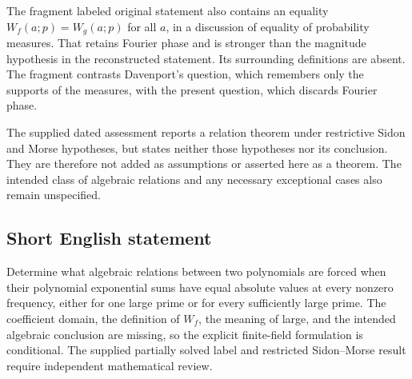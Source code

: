 \documentclass[11pt]{article}
\begin{document}
The fragment labeled original statement also contains an equality \(W_f(a;p)=W_g(a;p)\) for all \(a\), in a discussion of equality of probability measures. That retains Fourier phase and is stronger than the magnitude hypothesis in the reconstructed statement. Its surrounding definitions are absent. The fragment contrasts Davenport's question, which remembers only the supports of the measures, with the present question, which discards Fourier phase.

The supplied dated assessment reports a relation theorem under restrictive Sidon and Morse hypotheses, but states neither those hypotheses nor its conclusion. They are therefore not added as assumptions or asserted here as a theorem. The intended class of algebraic relations and any necessary exceptional cases also remain unspecified.
\subsection{Short English statement}
Determine what algebraic relations between two polynomials are forced when their polynomial exponential sums have equal absolute values at every nonzero frequency, either for one large prime or for every sufficiently large prime. The coefficient domain, the definition of \(W_f\), the meaning of large, and the intended algebraic conclusion are missing, so the explicit finite-field formulation is conditional. The supplied partially solved label and restricted Sidon--Morse result require independent mathematical review.
\end{document}
